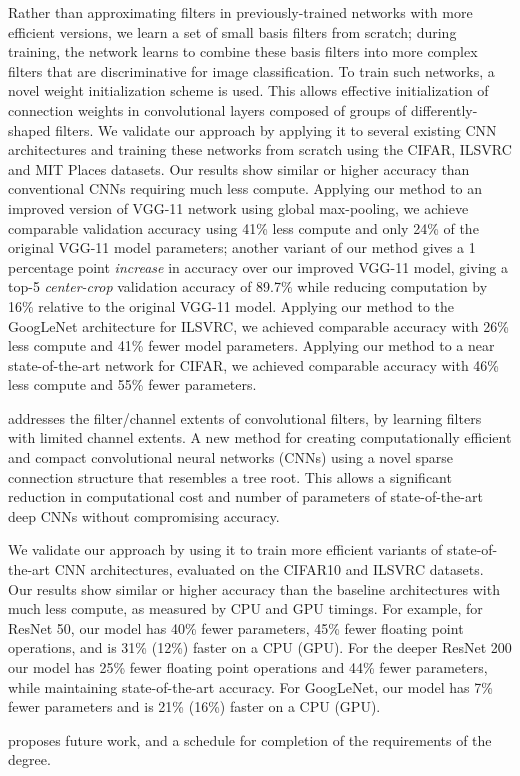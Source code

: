 \documentclass[thesis]{subfiles}
\begin{document}
\begin{description}
	Rather than approximating filters in previously-trained networks with more efficient versions, we learn a set of small basis filters from scratch; during training, the network learns to combine these basis filters into more complex filters that are discriminative for image classification. To train such networks, a novel weight initialization scheme is used. This allows effective initialization of connection weights in convolutional layers composed of groups of differently-shaped filters. We validate our approach by applying it to several existing CNN architectures and training these networks from scratch using the CIFAR, ILSVRC and MIT Places datasets. Our results show similar or higher accuracy than conventional CNNs requiring much less compute. Applying our method to an improved version of VGG-11 network using global max-pooling, we achieve comparable validation accuracy using 41\% less compute and only 24\% of the original VGG-11 model parameters; another variant of our method gives a 1 percentage point {\em increase} in accuracy over our improved VGG-11 model, giving a top-5 \emph{center-crop} validation accuracy of 89.7\% while reducing computation by 16\% relative to the original VGG-11 model. Applying our method to the GoogLeNet architecture for ILSVRC, we achieved comparable accuracy with 26\% less compute and 41\% fewer model parameters. Applying our method to a near state-of-the-art network for CIFAR, we achieved comparable accuracy with 46\% less compute and 55\% fewer parameters. 
	
	\item[\Cref{deeproots}] addresses the filter/channel extents of convolutional filters, by learning filters with limited channel extents. A new method for creating computationally efficient and compact convolutional neural networks (CNNs) using a novel sparse connection structure that resembles a tree root. This allows a significant reduction in computational cost and number of parameters of state-of-the-art deep CNNs without compromising accuracy. 
	
	We validate our approach by using it to train more efficient variants of state-of-the-art CNN architectures, evaluated on the CIFAR10 and ILSVRC datasets. Our results show similar or higher accuracy than the baseline architectures with much less compute, as measured by CPU and GPU timings. For example, for ResNet 50, our model has 40\% fewer parameters, 45\% fewer floating point operations, and is 31\% (12\%) faster on a CPU (GPU). For the deeper ResNet 200 our model has 25\% fewer floating point operations and 44\% fewer parameters, while maintaining state-of-the-art accuracy. For GoogLeNet, our model has 7\% fewer parameters and is 21\% (16\%) faster on a CPU (GPU).
	
	\item[\Cref{futurework}] proposes future work, and a schedule for completion of the requirements of the degree.
	
\end{description}
\end{document}
